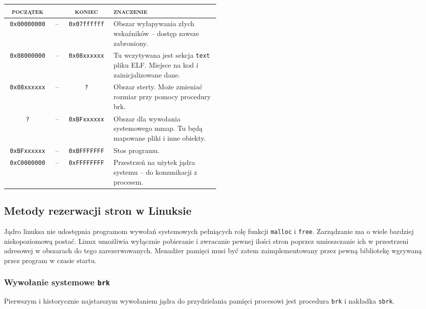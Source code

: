 \documentclass[12pt,a4paper,titlepage,twoside]{mwart}
\begin{document}
\begin{center}
\begin{tabular}{|ccc|p{0.5\linewidth}|}
\hline
\textsc{początek} & & \textsc{koniec} & \textsc{znaczenie} \\
\hline
\hline
\texttt{0x00000000} & -- & \texttt{0x07ffffff} & Obszar wyłapywania złych wskaźników -- dostęp zawsze zabroniony.\\
\hline
\texttt{0x08000000} & -- & \texttt{0x08xxxxxx} & Tu wczytywana jest sekcja \texttt{text} pliku ELF. Miejsce na kod i zainicjalizowane dane.\\
\hline
\texttt{0x08xxxxxx} & -- & \texttt{?}          & Obszar sterty. Może zmieniać rozmiar przy pomocy procedury brk.\\
\hline
\texttt{?}          & -- & \texttt{0xBFxxxxxx} & Obszar dla wywołania systemowego mmap. Tu będą mapowane pliki i inne obiekty.\\
\hline
\texttt{0xBFxxxxxx} & -- & \texttt{0xBFFFFFFF} & Stos programu.\\
\hline
\texttt{0xC0000000} & -- & \texttt{0xFFFFFFFF} & Przestrzeń na użytek jądra systemu -- do komunikacji z procesem.\\
\hline
\end{tabular}
\end{center}

\subsection{Metody rezerwacji stron w Linuksie}

Jądro linuksa nie udostępnia programom wywołań systemowych pełniących rolę
funkcji \texttt{malloc} i \texttt{free}. Zarządzanie ma o wiele bardziej
niskopoziomową postać. Linux umożliwia wyłącznie pobieranie i zwracanie pewnej
ilości stron poprzez umieszczanie ich w przestrzeni adresowej w obszarach do
tego zarezerwowanych. Menadżer pamięci musi być zatem zaimplementowany przez
pewną bibliotekę wgrywaną przez program w czasie startu.

\subsubsection{Wywołanie systemowe \texttt{brk}}

Pierwszym i historycznie najstarszym wywołaniem jądra do przydzielania pamięci
procesowi jest procedura \texttt{brk} i nakładka \texttt{sbrk}.

\vspace{4ex}
\end{document}
